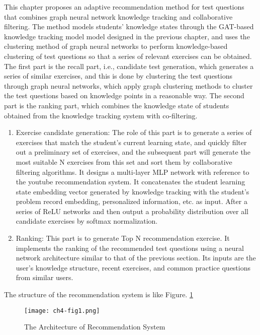 This chapter proposes an adaptive recommendation method for test questions that combines graph neural network knowledge tracking and collaborative filtering. The method models students' knowledge states through the GAT-based knowledge tracking model model designed in the previous chapter, and uses the clustering method of graph neural networks to perform knowledge-based clustering of test questions so that a series of relevant exercises can be obtained. The first part is the recall part, i.e., candidate test generation, which generates a series of similar exercises, and this is done by clustering the test questions through graph neural networks, which apply graph clustering methods to cluster the test questions based on knowledge points in a reasonable way. The second part is the ranking part, which combines the knowledge state of students obtained from the knowledge tracking system with co-filtering. 
\begin{enumerate}
  \item Exercise candidate generation: The role of this part is to generate a series of exercises that match the student's current learning state, and quickly filter out a preliminary set of exercises, and the subsequent part will generate the most suitable N exercises from this set and sort them by collaborative filtering algorithms. It designs a multi-layer MLP network with reference to the youtube recommendation system. It concatenates the student learning state embedding vector generated by knowledge tracking with the student's problem record embedding, personalized information, etc. as input. After a series of ReLU networks and then output a probability distribution over all candidate exercises by softmax normalization.
  \item Ranking: This part is to generate Top N recommendation exercise. It implements the ranking of the recommended test questions using a neural network architecture similar to that of the previous section. Its inputs are the user's knowledge structure, recent exercises, and common practice questions from similar users.
\end{enumerate}

The structure of the recommendation system is like Figure. \ref{fig0}

\begin{figure}[h]
	\centering
	\texttt{[image: ch4-fig1.png]}
	\caption{The Architecture of Recommendation System}
	\label{fig0}
\end{figure}

